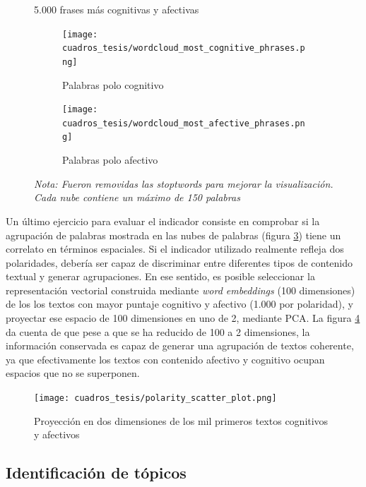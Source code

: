 \documentclass[
  12pt,
]{article}
\begin{document}
\begin{figure}[H]
     \caption{5.000 frases más cognitivas y afectivas}
     \centering
     \begin{subfigure}[b]{0.4\textwidth}
         \centering
         \texttt{[image: cuadros\_tesis/wordcloud\_most\_cognitive\_phrases.png]}
         \caption{Palabras polo cognitivo}
         \label{fig:cognitive_5000}
     \end{subfigure}
     \begin{subfigure}[b]{0.4\textwidth}
         \centering
         \texttt{[image: cuadros\_tesis/wordcloud\_most\_afective\_phrases.png]}
         \caption{Palabras polo afectivo}
         \label{fig:affective_5000}
     \end{subfigure}
     \label{fig:1000_phrases}
     \caption*{\footnotesize{\textit{Nota: Fueron removidas las \textit{stoptwords} para mejorar la visualización. Cada nube contiene un máximo de 150 palabras} }}
\end{figure}

Un último ejercicio para evaluar el indicador consiste en comprobar si
la agrupación de palabras mostrada en las nubes de palabras (figura
\ref{fig:1000_phrases}) tiene un correlato en términos espaciales. Si el
indicador utilizado realmente refleja dos polaridades, debería ser capaz
de discriminar entre diferentes tipos de contenido textual y generar
agrupaciones. En ese sentido, es posible seleccionar la representación
vectorial construida mediante \emph{word embeddings} (100 dimensiones)
de los los textos con mayor puntaje cognitivo y afectivo (1.000 por
polaridad), y proyectar ese espacio de 100 dimensiones en uno de 2,
mediante PCA. La figura \ref{scatter_embedding} da cuenta de que pese a
que se ha reducido de 100 a 2 dimensiones, la información conservada es
capaz de generar una agrupación de textos coherente, ya que
efectivamente los textos con contenido afectivo y cognitivo ocupan
espacios que no se superponen.

\begin{figure}[H]
\centering
\large
\caption{Proyección en dos dimensiones de los mil primeros textos cognitivos y afectivos}
\label{scatter_embedding}
\texttt{[image: cuadros\_tesis/polarity\_scatter\_plot.png]}
\normalsize
\end{figure}

\hypertarget{identificaciuxf3n-de-tuxf3picos}{%
\subsection{Identificación de
tópicos}\label{identificaciuxf3n-de-tuxf3picos}}
\end{document}
